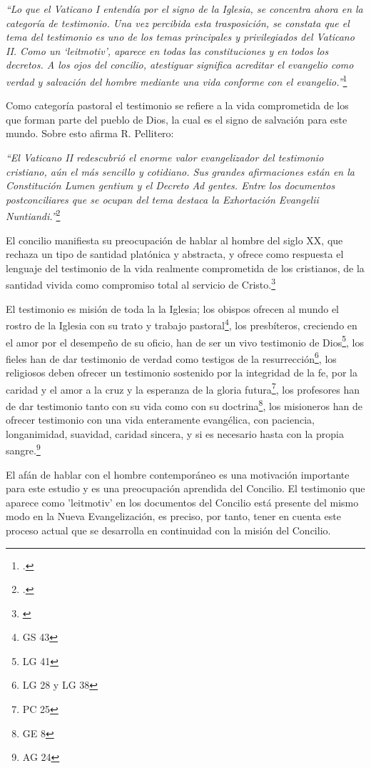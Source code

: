 \documentclass[../main.tex]{subfiles}
\begin{document}
\emph{
``Lo que el Vaticano I entendía por el signo de la Iglesia, se concentra ahora en la categoría de testimonio. Una vez percibida esta trasposición, se constata que el tema del testimonio es uno de los temas principales y privilegiados del Vaticano II. Como un `leitmotiv', aparece en todas las constituciones y en todos los decretos. A los ojos del concilio, atestiguar significa acreditar el evangelio como verdad y salvación del hombre mediante una vida conforme con el evangelio.''}\footcite[1532]{dicctf}

Como categoría pastoral el testimonio se refiere a la vida comprometida de los que forman parte del pueblo de Dios, la cual es el signo de salvación para este mundo. Sobre esto afirma R. Pellitero:

\emph{
``El Vaticano II redescubrió el enorme valor evangelizador del testimonio cristiano, aún el más sencillo y cotidiano. Sus grandes afirmaciones están en la Constitución Lumen gentium y el Decreto Ad gentes. Entre los documentos postconciliares que se ocupan del tema destaca la Exhortación Evangelii Nuntiandi.''}\footcite[378--379]{ftcpellitero}

El concilio manifiesta su preocupación de hablar al hombre del siglo XX, que rechaza un tipo de santidad platónica y abstracta, y ofrece como respuesta el lenguaje del testimonio de la vida realmente comprometida de los cristianos, de la santidad vivida como compromiso total al servicio de Cristo.\footnote{\cite[1532 y 1533]{dicctf}} 

El testimonio es misión de toda la la Iglesia; los obispos ofrecen al mundo el rostro de la Iglesia con su trato y trabajo pastoral\footnote{GS 43}, los presbíteros, creciendo en el amor por el desempeño de su oficio, han de ser un vivo testimonio de Dios\footnote{LG 41}, los fieles han de dar testimonio de verdad como testigos de la resurrección\footnote{LG 28 y LG 38}, los religiosos deben ofrecer un testimonio sostenido por la integridad de la fe, por la caridad y el amor a la cruz y la esperanza de la gloria futura\footnote{PC 25}, los profesores han de dar testimonio tanto con su vida como con su doctrina\footnote{GE 8}, los misioneros han de ofrecer testimonio con una vida enteramente evangélica, con paciencia, longanimidad, suavidad, caridad sincera, y si es necesario hasta con la propia sangre.\footnote{AG 24}

El afán de hablar con el hombre contemporáneo es una motivación importante para este estudio y es una preocupación aprendida del Concilio. El testimonio que aparece como 'leitmotiv' en los documentos del Concilio está presente del mismo modo en la Nueva Evangelización, es preciso, por tanto, tener en cuenta este proceso actual que se desarrolla en continuidad con la misión del Concilio. 
\end{document}
